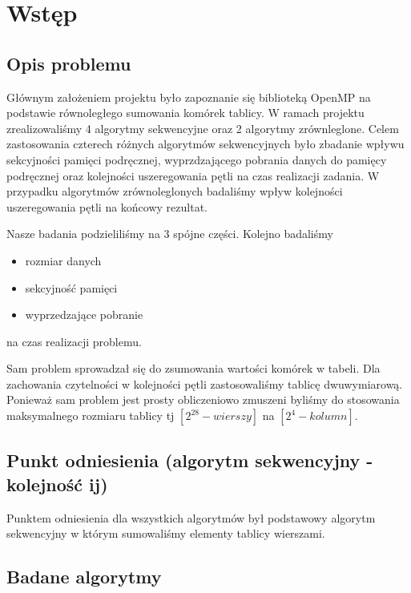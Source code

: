 \section{Wstęp}

\subsection{Opis problemu}

Głównym założeniem projektu było zapoznanie się biblioteką OpenMP na podstawie równoległego sumowania komórek tablicy. W ramach projektu zrealizowaliśmy 4 algorytmy sekwencyjne oraz 2 algorytmy zrównleglone. Celem zastosowania czterech różnych algorytmów sekwencyjnych było zbadanie wpływu sekcyjności pamięci podręcznej, wyprzdzającego pobrania danych do pamięcy podręcznej oraz kolejności uszeregowania pętli na czas realizacji zadania. W przypadku algorytmów zrównoleglonych badaliśmy wpływ kolejności uszeregowania pętli na końcowy rezultat.\newline

Nasze badania podzieliliśmy na 3 spójne części. Kolejno badaliśmy
\begin{itemize}
\item rozmiar danych
\item sekcyjność pamięci
\item wyprzedzające pobranie
\end{itemize}
na czas realizacji problemu.\newline

Sam problem sprowadzał się do zsumowania wartości komórek w tabeli. Dla zachowania czytelności w kolejności pętli zastosowaliśmy tablicę dwuwymiarową. Ponieważ sam problem jest prosty obliczeniowo zmuszeni byliśmy do stosowania maksymalnego rozmiaru tablicy tj $[2^{28} - wierszy]$ na $[2^{4} - kolumn]$.

\subsection{Punkt odniesienia (algorytm sekwencyjny - kolejność ij)}

Punktem odniesienia dla wszystkich algorytmów był podstawowy algorytm sekwencyjny w którym sumowaliśmy elementy tablicy wierszami.




\subsection{Badane algorytmy}


